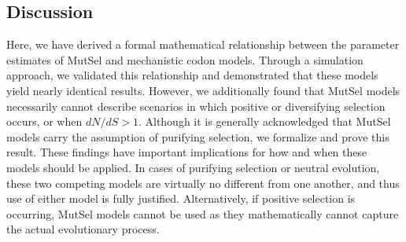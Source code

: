 \documentclass[11pt]{article}
\begin{document}




\subsection*{Discussion}

Here, we have derived a formal mathematical relationship between the parameter estimates of MutSel and mechanistic codon models. Through a simulation approach, we validated this relationship and demonstrated that these models yield nearly identical results. However, we additionally found that MutSel models necessarily cannot describe scenarios in which positive or diversifying selection occurs, or when $dN/dS > 1$. Although it is generally acknowledged that MutSel models carry the assumption of purifying selection, we formalize and prove this result. These findings have important implications for how and when these models should be applied. In cases of purifying selection or neutral evolution, these two competing models are virtually no different from one another, and thus use of either model is fully justified. Alternatively, if positive selection is occurring, MutSel models cannot be used as they mathematically cannot capture the actual evolutionary process.
\end{document}
